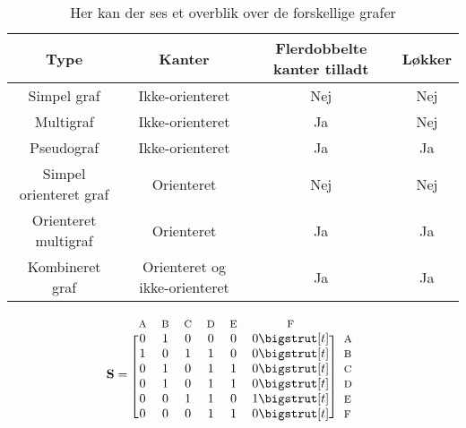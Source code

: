 \begin{table}[h]
\begin{tabular}{|c|c|c|c|}
\hline 
Type & Kanter & Flerdobbelte kanter tilladt & Løkker \\ 
\hline
Simpel graf & Ikke-orienteret & Nej & Nej	 \\ 

Multigraf & Ikke-orienteret & Ja & Nej \\ 

Pseudograf & Ikke-orienteret & Ja & Ja \\ 
 
Simpel orienteret graf & Orienteret & Nej & Nej \\ 
 
Orienteret multigraf & Orienteret & Ja & Ja \\ 
 
Kombineret graf & Orienteret og ikke-orienteret & Ja & Ja \\ 
\hline 
\end{tabular}
\caption{Her kan der ses et overblik over de forskellige grafer} \label{table:graf_oversigt}
\end{table}



 
 \begin{equation*}
  \mathbf{S}=
  \begin{blockarray}{*{6}{c} l}
    \begin{block}{*{6}{>{$\footnotesize}c<{$}} l}
      A & B & C & D & E & F \\
    \end{block}
    \begin{block}{[*{6}{c}]>{$\footnotesize}l<{$}}
      0 & 1 & 0 & 0 & 0 & 0 \bigstrut[t]& A \\
      1 & 0 & 1 & 1 & 0 & 0 \bigstrut[t]&B \\
      0 & 1 & 0 & 1 & 1 & 0 \bigstrut[t]&C \\
      0 & 1 & 0 & 1 & 1 & 0 \bigstrut[t]& D \\
      0 & 0 & 1 & 1 & 0 & 1 \bigstrut[t]& E \\
      0 & 0 & 0 & 1 & 1 & 0 \bigstrut[t]& F \\
    \end{block}
  \end{blockarray}
\end{equation*}
